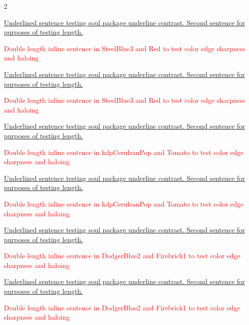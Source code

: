 \begin{multicols}{2}
\clearpage
{}
\par\noindent\ul{Underlined sentence testing soul package underline contrast. Second sentence for purposes of testing length.}
\par\noindent\textcolor{Red}{Double length inline sentence in SteelBlue3 and Red to test color edge sharpness and haloing}
\clearpage
{}
\par\noindent\ul{Underlined sentence testing soul package underline contrast. Second sentence for purposes of testing length.}
\par\noindent\textcolor{Red}{Double length inline sentence in SteelBlue3 and Red to test color edge sharpness and haloing}
\clearpage
{}
\par\noindent\ul{Underlined sentence testing soul package underline contrast. Second sentence for purposes of testing length.}
\par\noindent\textcolor{Red}{Double length inline sentence in kdpCeruleanPop and Tomato to test color edge sharpness and haloing}
\clearpage
{}
\par\noindent\ul{Underlined sentence testing soul package underline contrast. Second sentence for purposes of testing length.}
\par\noindent\textcolor{Red}{Double length inline sentence in kdpCeruleanPop and Tomato to test color edge sharpness and haloing}
\clearpage
{}
\par\noindent\ul{Underlined sentence testing soul package underline contrast. Second sentence for purposes of testing length.}
\par\noindent\textcolor{Red}{Double length inline sentence in DodgerBlue2 and Firebrick1 to test color edge sharpness and haloing}
\clearpage
{}
\par\noindent\ul{Underlined sentence testing soul package underline contrast. Second sentence for purposes of testing length.}
\par\noindent\textcolor{Red}{Double length inline sentence in DodgerBlue2 and Firebrick1 to test color edge sharpness and haloing}

\end{multicols}
